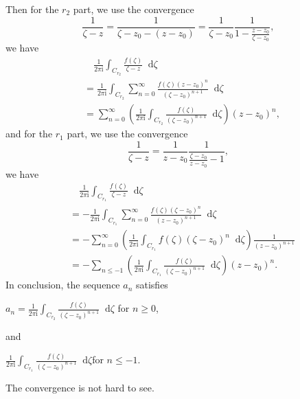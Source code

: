 \documentclass[11pt]{report}
\theoremstyle{mythm}
\let\oldendproof\endproof
\renewenvironment{proof}[1][\proofname]{%
  \oldproof[\normalfont \bfseries #1]%
}{\oldendproof}
\renewcommand*{\proofname}{Proof}
\theoremstyle{myans}
\newcommand{\mi}{\mathrm{i}}
\newcommand{\dd}{\mathop{}\!\mathrm{d}}
\begin{document}
\begin{enumerate}
\begin{enumerate}
\begin{proof}
      Then for the $r_2$ part, we use the convergence
      \[ \frac 1{\zeta - z} = \frac 1{\zeta - z_0 - (z - z_0)} = \frac 1{\zeta - z_0}\frac 1{1 - \frac{z-z_0}{\zeta-z_0}}, \]
      we have
      \begin{align*}
        &\quad \frac 1{2\pi \mi} \int_{C_{r_2}} \frac{f(\zeta)}{\zeta-z}\dd \zeta\\
        &= \frac 1{2\pi \mi} \int_{C_{r_2}} \sum_{n=0}^\infty \frac {f(\zeta)(z-z_0)^{n}}{(\zeta - z_0)^{n+1}} \dd \zeta\\
        &= \sum_{n=0}^\infty \left(\frac 1{2\pi \mi} \int_{C_{r_2}} \frac {f(\zeta)}{(\zeta - z_0)^{n+1}} \dd \zeta\right) (z-z_0)^{n},
      \end{align*}
      and for the $r_1$ part, we use the convergence
      \[ \frac 1{\zeta - z} = \frac 1{z-z_0} \frac 1{\frac{\zeta - z_0}{z-z_0} - 1}, \]
      we have
      \begin{align*}
        &\quad \frac 1{2\pi \mi}\int_{C_{r_1}} \frac{f(\zeta)}{\zeta-z}\dd \zeta\\
        &= -\frac 1{2\pi \mi}\int_{C_{r_1}} \sum_{n=0}^\infty \frac{f(\zeta) (\zeta-z_0)^n}{(z-z_0)^{n+1}} \dd \zeta\\
        &= -\sum_{n=0}^\infty \left( \frac 1{2\pi \mi}\int_{C_{r_1}}f(\zeta) (\zeta-z_0)^n \dd \zeta\right) \frac{1}{(z-z_0)^{n+1}}\\
        &= -\sum_{n\leq -1} \left( \frac 1{2\pi \mi}\int_{C_{r_1}} \frac{f(\zeta)}{(\zeta-z_0)^{n+1}} \dd \zeta\right) (z-z_0)^{n}.
      \end{align*}
      In conclusion, the sequence $a_n$ satisfies
      \begin{center}
        $\displaystyle a_n = \frac 1{2\pi \mi}\int_{C_{r_2}} \frac{f(\zeta)}{(\zeta-z_0)^{n+1}} \dd \zeta$
        \quad for $n\geq 0$,
      \end{center}
      and
      \begin{center}
        $\displaystyle \frac 1{2\pi \mi}\int_{C_{r_1}} \frac{f(\zeta)}{(\zeta-z_0)^{n+1}} \dd \zeta$\quad for $n\leq -1$.
      \end{center}
      The convergence is not hard to see.
    \end{proof}
  \end{enumerate}
\end{enumerate}
\end{document}
